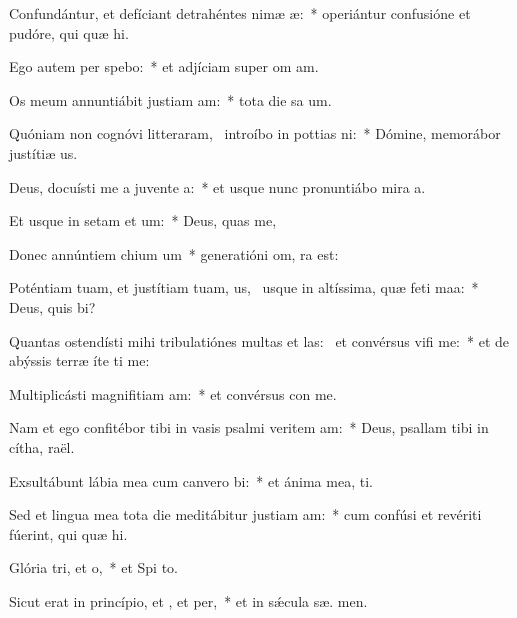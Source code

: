 \item Confundántur, et defíciant detrahéntes nimæ æ:~* operiántur confusióne et pudóre, qui quæ  hi.
\item Ego autem per spebo:~* et adjíciam super om  am.
\item Os meum annuntiábit justiam am:~* tota die sa um.
\item Quóniam non cognóvi litteraram,~\pscross{} introíbo in pottias ni:~* Dómine, memorábor justítiæ  us.
\item Deus, docuísti me a juvente a:~* et usque nunc pronuntiábo mira a.
\item Et usque in setam et um:~* Deus,  quas me,
\item Donec annúntiem chium um~* generatióni om,  ra est:
\item Poténtiam tuam, et justítiam tuam, us,~\pscross{} usque in altíssima, quæ feti maa:~* Deus, quis  bi?
\item Quantas ostendísti mihi tribulatiónes multas et las:~\pscross{} et convérsus vifi me:~* et de abýssis terræ íte ti me:
\item Multiplicásti magnifitiam am:~* et convérsus con  me.
\item Nam et ego confitébor tibi in vasis psalmi veritem am:~* Deus, psallam tibi in cítha,  raël.
\item Exsultábunt lábia mea cum canvero bi:~* et ánima mea,  ti.
\item Sed et lingua mea tota die meditábitur justiam am:~* cum confúsi et revériti fúerint, qui quæ  hi.
\item Glória tri, et o,~* et Spi to.
\item Sicut erat in princípio, et , et per,~* et in sǽcula sæ. men.
